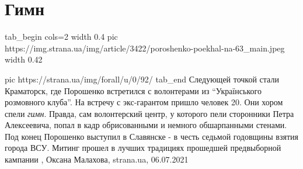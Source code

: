  
 
 
 
 
\chapter{Гимн}
\label{sec:slova.gimn}

\ifcmt
tab_begin cols=2
	width 0.4
	pic https://img.strana.ua/img/article/3422/poroshenko-poekhal-na-63_main.jpeg
	width 0.42

  pic https://strana.ua/img/forall/u/0/92/%
tab_end
\fi
Следующей точкой стали Краматорск, где Порошенко встретился с волонтерами из
\enquote{Українського розмовного клуба}. На встречу с экс-гарантом пришло
человек 20. Они хором спели \emph{гимн}. Правда, сам волонтерский центр, у
которого пели сторонники Петра Алексеевича, попал в кадр обрисованными и
немного обшарпанными стенами.  Под конец Порошенко выступил в Славянске - в
честь седьмой годовщины взятия города ВСУ. Митинг прошел в лучших традициях
прошедшей предвыборной кампании
, 
Оксана Малахова, strana.ua, 06.07.2021

